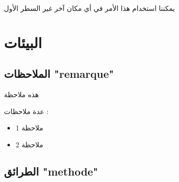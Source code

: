 \documentclass[12pt,a4paper]{mathbook_arabic}
\newcommand\ee{\textenglish}
\begin{document}
\begin{remarque}
يمكننا استخدام هذا الأمر في أي مكان آخر غير السطر الأول
 \end{remarque}

 
\section{البيئات}

\subsection{الملاحظات \ee{"remarque"}}

\begin{minipage}{.4\textwidth}
\begin{remarque}
هذه ملاحظة
\end{remarque}
 
 

\begin{remarque}
عدة ملاحظات :\par
\begin{itemize}
\item ملاحظة 1
\item ملاحظة 2
\end{itemize}
\end{remarque}

\end{minipage}\qquad
\begin{minipage}{.4\textwidth}
\end{minipage}


 \subsection{الطرائق \ee{"methode"}}
\end{document}
